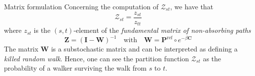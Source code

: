 \documentclass[13pt]{beamer}
\begin{document}
    \begin{frame}[t,allowframebreaks]{Matrix formulation}
    Concerning the computation of $\mathcal{Z}_{st}$, we have that
    \begin{equation*}
    \mathcal{Z}_{st}=\frac{z_{st}}{z_{tt}} 
    \end{equation*}
    where $z_{st}$ is the $(s,t)$-element of the \emph{fundamental matrix of non-absorbing paths}
    \begin{equation*}
    \mathbf{Z}=(\mathbf{I}-\mathbf{W})^{-1}\quad\text{with}\quad \mathbf{W}=\mathbf{P}^{\text{ref}}\circ e^{-\beta\mathbf{C}}
    \end{equation*}
    The matrix $\mathbf{W}$ is a substochastic matrix and can be interpreted as defining a \emph{killed random walk}. Hence, one can see the partition function $\mathcal{Z}_{st}$ as the probability of a walker surviving the walk from $s$ to $t$.
    \end{frame}
\end{document}
